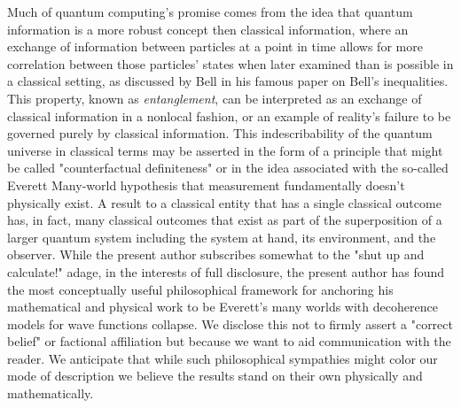 Much of quantum computing's promise comes from the idea that quantum information
is a more robust concept then classical information, where an exchange of
information between particles at a point in time allows for more correlation
between those particles' states when later examined than is possible in a
classical setting, as discussed by Bell in his famous paper on Bell's
inequalities\cite{BellTheorem}. This property, known as \emph{entanglement}, can
be interpreted as an exchange of classical information in a nonlocal fashion, or
an example of reality's failure to be governed purely by classical information.
This indescribability of the quantum universe in classical terms may be asserted
in the form of a principle that might be called "counterfactual definiteness" or
in the idea associated with the so-called Everett Many-world hypothesis that
measurement fundamentally doesn't physically exist. A result to a classical
entity that has a single classical outcome has, in fact, many classical outcomes
that exist as part of the superposition of a larger quantum system including the
system at hand, its environment, and the observer. While the present author
subscribes somewhat to the "shut up and calculate!" adage, in the interests of
full disclosure, the present author has found the most conceptually useful
philosophical framework for anchoring his mathematical and physical work to be
Everett's many worlds with decoherence models for wave functions collapse. We
disclose this not to firmly assert a "correct belief" or factional affiliation
but because we want to aid communication with the reader. We anticipate that
while such philosophical sympathies might color our mode of description we
believe the results stand on their own physically and mathematically.

